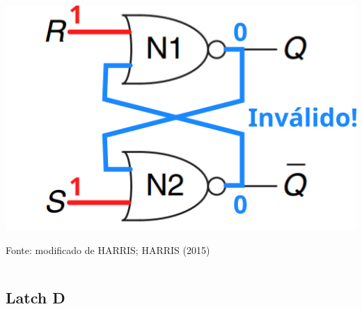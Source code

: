 \documentclass{beamer}
\begin{document}
\begin{frame}
\begin{columns}
\begin{column}[t]{0.45\textwidth}
{                
                \includegraphics[width=0.5\columnwidth]{figures/latch_sr_invalid.png}
                \caption*{\tiny Fonte: modificado de HARRIS; HARRIS (2015)}
            }
        \end{column}    
        
    \end{columns}
\end{frame}

\subsection{Latch D}
\end{document}
